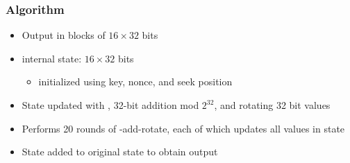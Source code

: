 \documentclass[draft]{article}
\begin{document}
\begin{multicols}{2}
    \subsubsection*{Algorithm}
    \begin{itemize}[nosep]
        \item Output in blocks of $16\times32$ bits
        \item internal state: $16\times 32$ bits
              \begin{itemize}[nosep]\item initialized using key, nonce, and seek position\end{itemize}
        \item State updated with , 32-bit addition mod $2^{32}$, and rotating 32 bit values
        \item Performs 20 rounds of -add-rotate, each of which updates all values in state
        \item State added to original state to obtain output
    \end{itemize}
\end{multicols}
\end{document}
